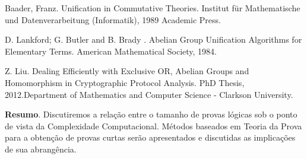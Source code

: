 	\begin{thebibliography}{999}
		 Baader, Franz. Unification in Commutative Theories. Institut für Mathematische und Datenverarbeitung (Informatik), 1989 Academic Press.
		
		 D. Lankford; G. Butler and B. Brady . Abelian Group Unification Algorithms for Elementary Terms. American Mathematical Society, 1984.
		
		 Z. Liu. Dealing Efficiently with Exclusive OR, Abelian Groups and Homomorphism in Cryptographic Protocol Analysis. PhD Thesis, 2012.Department of Mathematics and Computer Science - Clarkson University.
	\end{thebibliography}

	\vspace{24pt}



	\noindent\textbf{Resumo}.\label{ehh} 
	Discutiremos a relação entre o tamanho de provas lógicas sob o ponto de vista da Complexidade Computacional. Métodos baseados em Teoria da Prova para a obtenção de provas curtas serão apresentados e discutidas as implicações de sua abrangência. 


\vspace{24pt}

